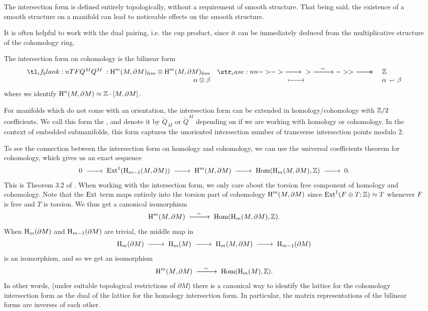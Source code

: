 \begin{remark*}
	The intersection form is defined entirely topologically, without a requirement of smooth structure. That being said, the existence of a smooth structure on a manifold can lead to noticeable effects on the smooth structure.
\end{remark*}

It is often helpful to work with the dual pairing, i.e. the cup product, since it can be immediately deduced from the multiplicative structure of the cohomology ring.
\begin{definition}
	The intersection form on cohomology is the bilinear form
	\begin{equation}
		\lkxfunc{Q^M}{\H^m(M,\partial M)_{\mathrm{free}}\otimes \H^m(M,\partial M)_{\mathrm{free}}}{\Z}{\alpha\otimes \beta}{\alpha\smile \beta}
	\end{equation}
	where we identify $\operatorname{H}^n(M,\partial M)\approx \mathbb{Z}\cdot [M,\partial M]$.
\end{definition}

\begin{remark*}
	For manifolds which do not come with an orientation, the intersection form can be extended in homology/cohomology with $\mathbb{Z}/2$ coefficients. We call this form the , and denote it by $\widetilde{Q}_M$ or $\widetilde{Q}^M$ depending on if we are working with homology or cohomology. In the context of embedded submanifolds, this form captures the unoriented intersection number of transverse intersection points modulo 2.
\end{remark*}

\begin{remark*} \label{rmk:dual-lattice-intersection-form}
	To see the connection between the intersection form on homology and cohomology, we can use the universal coefficients theorem for cohomology, which gives us an exact sequence
	\[
		0 \lkxto \Ext^1(\H_{m-1}(M,\partial M)) \lkxto \H^m(M, \partial M) \lkxto \Hom(\H_m(M, \partial M), \Z) \lkxto 0.
	\]
	This is Theorem 3.2 of \cite{hatcher2002topology}. When working with the intersection form, we only care about the torsion free component of homology and cohomology. Note that the $\operatorname{Ext}$ term maps entirely into the torsion part of cohomology $\operatorname{H}^m(M,\partial M)$ since $\operatorname{Ext}^1(F\oplus T; \mathbb{Z})\approx T$ whenever $F$ is free and $T$ is torsion. We thus get a canonical isomorphism
	\[
		\H^m(M, \partial M) \lkxisom \Hom(\H_m(M,\partial M), \Z).
	\]
	When $\operatorname{H}_{m}(\partial M)$ and $\operatorname{H}_{m-1}(\partial M)$ are trivial, the middle map in
	\[
		\H_m(\partial M) \lkxto \H_m(M) \lkxto \H_m(M,\partial M) \lkxto \H_{m-1}(\partial M)
	\]
	is an isomorphism, and so we get an isomorphism
	\[
		\H^m(M, \partial M) \lkxisom \Hom(\H_m(M), \Z).
	\]
	In other words, (under suitable topological restrictions of $\partial M$) there is a canonical way to identify the lattice for the cohomology intersection form as the dual of the lattice for the homology intersection form. In particular, the matrix representations of the bilinear forms are inverses of each other.
\end{remark*}


